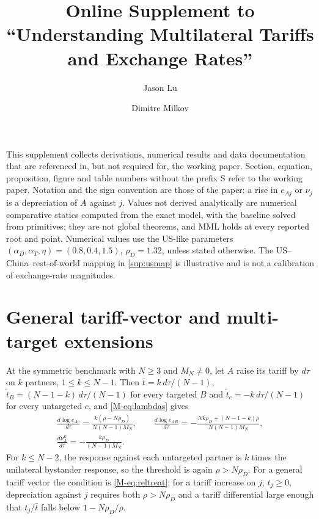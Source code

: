 \documentclass[11pt]{article}
\title{\textbf{Online Supplement to\\ ``Understanding Multilateral Tariffs and Exchange Rates''}}
\author{Jason Lu \and Dimitre Milkov}
\date{\vspace{-1.5em}}
\numberwithin{equation}{section}
\theoremstyle{plain}
\begin{document}
\maketitle

\noindent This supplement collects derivations, numerical results and data documentation that are referenced in, but not required for, the working paper. Section, equation, proposition, figure and table numbers without the prefix S refer to the working paper. Notation and the sign convention are those of the paper: a rise in $e_{Aj}$ or $\nu_j$ is a depreciation of $A$ against $j$. Values not derived analytically are numerical comparative statics computed from the exact model, with the baseline solved from primitives; they are not global theorems, and MML holds at every reported root and point. Numerical values use the US-like parameters $(\alpha_D,\alpha_T,\eta)=(0.8,0.4,1.5)$, $\rho_D=1.32$, unless stated otherwise. The US--China--rest-of-world mapping in \cref{sup:usmap} is illustrative and is not a calibration of exchange-rate magnitudes.

\section{General tariff-vector and multi-target extensions}

At the symmetric benchmark with $N\geq3$ and $M_N\neq0$, let $A$ raise its tariff by $d\tau$ on $k$ partners, $1\leq k\leq N-1$. Then $\bar t=k\,d\tau/(N-1)$, $\widetilde t_B=(N-1-k)\,d\tau/(N-1)$ for every targeted $B$ and $\widetilde t_c=-k\,d\tau/(N-1)$ for every untargeted $c$, and \cref{M-eq:lambdas} gives
\begin{equation}
\begin{gathered}
\frac{d\log e_{Ac}}{d\tau}=\frac{k(\rho-N\rho_D)}{N(N-1)M_N},\qquad
\frac{d\log e_{AB}}{d\tau}=-\frac{Nk\rho_D+(N-1-k)\rho}{N(N-1)M_N},\\
\frac{d\nu^E_A}{d\tau}=-\frac{k\rho_D}{(N-1)M_N}.
\end{gathered}
\end{equation}
For $k\leq N-2$, the response against each untargeted partner is $k$ times the unilateral bystander response, so the threshold is again $\rho>N\rho_D$. For a general tariff vector the condition is \cref{M-eq:reltreat}: for a tariff increase on $j$, $t_j\geq0$, depreciation against $j$ requires both $\rho>N\rho_D$ and a tariff differential large enough that $t_j/\bar t$ falls below $1-N\rho_D/\rho$.
\end{document}
